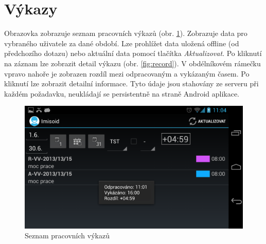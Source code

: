 \documentclass{diplomka}
\begin{document}
\section{Výkazy}
\label{sec:records}
Obrazovka zobrazuje seznam pracovních výkazů (obr. \ref{fig:records}). Zobrazuje data pro vybraného uživatele za dané období. Lze prohlížet data uložená offline (od předchozího dotazu) nebo aktuální data pomocí tlačítka \emph{Aktualizovat}. Po kliknutí na záznam lze zobrazit detail výkazu (obr. \ref{fig:record}). V obdélníkovém rámečku vpravo nahoře je zobrazen rozdíl mezi odpracovaným a vykázaným časem. Po kliknutí lze zobrazit detailní informace. Tyto údaje jsou stahovány ze serveru při každém požadavku, neukládají se persistentně na straně Android aplikace.
\vspace{-1.5mm}
\begin{figure}[H]
  \centering
  \includegraphics[scale=0.25]{scr/records.png}
    \caption{Seznam pracovních výkazů}
  \label{fig:records}
\end{figure}
\end{document}
